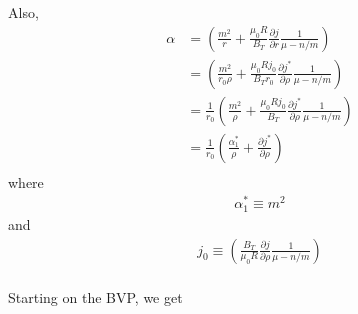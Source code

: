 \documentclass{article}
\begin{document}
Also,
\begin{equation} \label{}
\begin{split}
\alpha&=\left( \frac{m^2}{r} +\frac{\mu_0 R}{B_T} \frac{\partial j}{\partial r}\frac{1}{\mu-n/m} \right) \\
&=\left( \frac{m^2}{r_0 \rho} +\frac{\mu_0 R j_0}{B_T r_0} \frac{\partial j^*}{\partial \rho}\frac{1}{\mu-n/m} \right) \\
&=\frac{1}{r_0}\left( \frac{m^2}{ \rho} +\frac{\mu_0 R j_0}{B_T} \frac{\partial j^*}{\partial \rho}\frac{1}{\mu-n/m} \right) \\
&=\frac{1}{r_0}\left( \frac{\alpha^*_1}{ \rho} +\frac{\partial j^*}{\partial \rho} \right) \\%
\end{split} 
\end{equation} 
where
\begin{equation} \label{}
\begin{split}
\alpha_1^* \equiv m^2
\end{split} 
\end{equation} 
and
\begin{equation} \label{}
\begin{split}
j_0 \equiv \left( \frac{B_T}{\mu_0 R} \frac{\partial j}{\partial \rho}\frac{1}{\mu-n/m} \right) \\
\end{split} 
\end{equation} 

Starting on the BVP, we get
\end{document}
